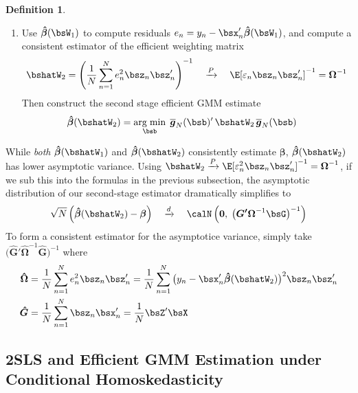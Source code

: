 \documentclass[12pt]{article}
\theoremstyle{plain}
\theoremstyle{definition}
\newtheorem{defn}[thm]{Definition}
\theoremstyle{remark}
\newcommand{\bsbeta}{\boldsymbol{\beta}}
\newcommand{\bshatG}{\boldsymbol{\hat{G}}}
\newcommand{\bsOmega}{\boldsymbol{\Omega}}
\newcommand{\bshatbeta}{\boldsymbol{\hat{\beta}}}
\newcommand{\bshatOmega}{\boldsymbol{\hat{\Omega}}}
\newcommand{\bsbarg}{\boldsymbol{\overline{g}}}
\renewcommand{\bso}{\boldsymbol{0}}
\newcommand{\bsGp}{\boldsymbol{G'}}
\DeclareMathOperator*{\argmin}{arg\;min}
\newcommand{\pto}{\xrightarrow{P}}
\newcommand{\dto}{\xrightarrow{d}}
\newcommand{\sumnN}{\sum^N_{n=1}}
\begin{document}
\begin{defn}
\begin{enumerate}[label=(\roman*)]
  \item Use $\bshatbeta(\bsW_1)$ to compute residuals
    $e_n = y_n - \bsx_n'\bshatbeta(\bsW_1)$, and compute a consistent
    estimator of the efficient weighting matrix
    \begin{align*}
      \bshatW_2 = \left(\frac{1}{N}\sumnN e_n^2\bsz_n\bsz_n'\right)^{-1}
      \quad\pto\quad \E[\varepsilon_n\bsz_n\bsz_n']^{-1}
      = \bsOmega^{-1}
    \end{align*}
    Then construct the second stage efficient GMM estimate
    \begin{alignat*}{3}
      \bshatbeta(\bshatW_2) &=
      \argmin_{\bsb}\;
      \bsbarg_N(\bsb)' \, \bshatW_2 \, \bsbarg_N(\bsb)
    \end{alignat*}
\end{enumerate}
While \emph{both} $\bshatbeta(\bshatW_1)$ and $\bshatbeta(\bshatW_2)$
consistently estimate $\bsbeta$, $\bshatbeta(\bshatW_2)$ has lower
asymptotic variance.
Using $\bshatW_2\pto \E[\varepsilon_n^2\bsz_n\bsz_n']^{-1}=\bsOmega^{-1}$,
if we sub this into the formulas in the previous subsection, the
asymptotic distribution of our second-stage estimator dramatically
simplifies to
\begin{align*}
  \sqrt{N}\left(\bshatbeta(\bshatW_2) - \bsbeta\right)
  \quad \dto \quad
  \calN\left(
    \bso,\;
    \big(
    \bsGp
    \bsOmega^{-1}
    \bsG
    \big)^{-1}
  \right)
\end{align*}
To form a consistent estimator for the asymptotice variance, simply
take $\big(\bshatG'\bshatOmega^{-1}\bshatG\big)^{-1}$ where
\begin{align*}
  \bshatOmega &=
  \frac{1}{N}\sumnN e_n^2\bsz_n\bsz_n'
  =
  \frac{1}{N}\sumnN \big(y_n-\bsx_n'\bshatbeta(\bshatW_2)\big)^2\bsz_n\bsz_n'
  \\
  \bshatG
  &=
  \frac{1}{N}\sumnN
  \bsz_n\bsx_n'
  = \frac{1}{N}\bsZ'\bsX
\end{align*}
\end{defn}

\clearpage
\subsection{2SLS and Efficient GMM Estimation under Conditional Homoskedasticity}
\end{document}
